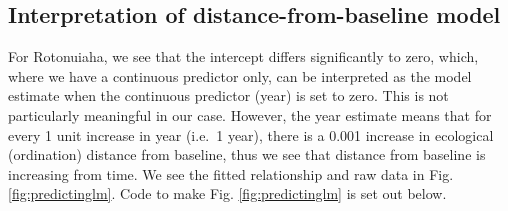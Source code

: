 \documentclass[nofonts,]{tufte-handout}
\begin{document}
\hypertarget{interpretation-of-distance-from-baseline-model}{%
\subsection{Interpretation of distance-from-baseline
model}\label{interpretation-of-distance-from-baseline-model}}

For Rotonuiaha, we see that the intercept differs significantly to zero,
which, where we have a continuous predictor only, can be interpreted as
the model estimate when the continuous predictor (year) is set to zero.
This is not particularly meaningful in our case. However, the year
estimate means that for every 1 unit increase in year (i.e.~1 year),
there is a 0.001 increase in ecological (ordination) distance from
baseline, thus we see that distance from baseline is increasing from
time. We see the fitted relationship and raw data in Fig.
\ref{fig:predictinglm}. Code to make Fig. \ref{fig:predictinglm} is set
out below.
\end{document}

